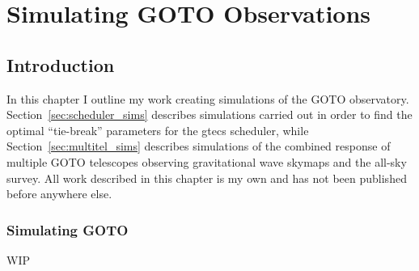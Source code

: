\chapter{Simulating GOTO Observations}
\label{chap:sims}
\chaptoc{}


\newpage
\section{Introduction}
\label{sec:sims_intro}
\begin{colsection}


\begin{colsection}

In this chapter I outline my work creating simulations of the GOTO observatory. Section~\ref{sec:scheduler_sims} describes simulations carried out in order to find the optimal ``tie-break'' parameters for the \gls{gtecs} scheduler, while Section~\ref{sec:multitel_sims} describes simulations of the combined response of multiple GOTO telescopes observing gravitational wave skymaps and the all-sky survey. All work described in this chapter is my own and has not been published before anywhere else.

\end{colsection}


\subsection{Simulating GOTO}
\label{sec:goto_sims}
\begin{colsection}

WIP

\end{colsection}


\end{colsection}


\newpage
